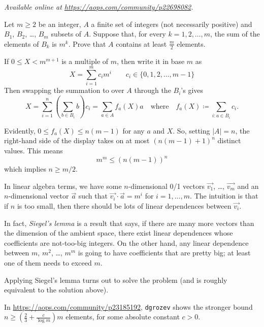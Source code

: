 
\textsl{Available online at \url{https://aops.com/community/p22698082}.}
\begin{mdframed}[style=mdpurplebox,frametitle={Problem statement}]
Let $m \ge 2$ be an integer,
$A$ a finite set of integers (not necessarily positive)
and $B_1$, $B_2$, \dots, $B_m$ subsets of $A$.
Suppose that, for every $k=1,2,\dots,m$,
the sum of the elements of $B_k$ is $m^k$.
Prove that $A$ contains at least $\frac{m}{2}$ elements.
\end{mdframed}
If $0 \le X < m^{m+1}$ is a multiple of $m$, then write it in base $m$ as
\[ X = \sum_{i=1}^m c_i m^i \qquad c_i \in \{0,1,2,\dots,m-1\} \]
Then swapping the summation to over $A$ through the $B_i$'s gives
\[ X = \sum_{i = 1}^n \left( \sum_{b \in B_i} b \right) c_i
  = \sum_{a \in A}  f_a(X) a
  \quad\text{where}\quad
  f_a(X) \coloneqq \sum_{i : a \in B_i} c_i.
\]

Evidently, $0 \le f_a(X) \le n(m-1)$ for any $a$ and $X$.
So, setting $|A| = n$, the right-hand side of the display takes on at most
$\left( n(m-1) + 1 \right)^n$ distinct values.
This means
\[ m^m \le \left( n(m-1) \right)^n \]
which implies $n \ge m/2$.

\begin{remark*}
  In linear algebra terms,
  we have some $n$-dimensional 0/1 vectors $\vec{v_1}$, \dots, $\vec{v_m}$
  and an $n$-dimensional vector $\vec a$
  such that $\vec{v_i} \cdot \vec a = m^i$ for $i=1, \dots, m$.
  The intuition is that if $n$ is too small,
  then there should be lots of linear dependences between $\vec{v_i}$.

  In fact, \emph{Siegel's lemma} is a result that says,
  if there are many more vectors than the dimension of the ambient space,
  there exist linear dependences whose coefficients are not-too-big integers.
  On the other hand, any linear dependence between $m$, $m^2$, \dots, $m^m$
  is going to have coefficients that are pretty big;
  at least one of them needs to exceed $m$.

  Applying Siegel's lemma turns out to solve the problem
  (and is roughly equivalent to the solution above).
\end{remark*}

\begin{remark*}
  In \url{https://aops.com/community/p23185192},
  \texttt{dgrozev} shows the stronger bound
  $n \ge \left(\frac{2}{3}+\frac{c}{\log m} \right)m$ elements,
  for some absolute constant $c > 0$.
\end{remark*}
\pagebreak



